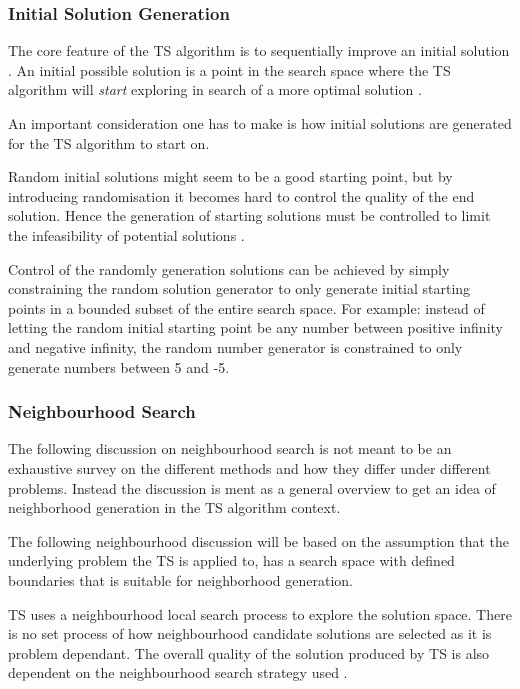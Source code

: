 \subsubsection{Initial Solution Generation}
The core feature of the \gls{TS} algorithm is to sequentially improve an initial solution \cite{TSHazardous}. An initial possible solution is a point in the search space where the \gls{TS} algorithm will \emph{start} exploring in search of a more optimal solution \cite{AIModernApproach,TSHazardous}.

An important consideration one has to make is how initial solutions are generated for the \gls{TS} algorithm to start on\cite{AIModernApproach,TSHazardous}.

Random initial solutions might seem to be a good starting point, but by introducing randomisation it becomes hard to control the quality of the end solution\cite{TSHazardous}. Hence the generation of starting solutions must be controlled to limit the infeasibility of potential solutions \cite{TSHazardous}. 

Control of the randomly generation solutions can be achieved by simply constraining the random solution generator to only generate initial starting points in a bounded subset of the entire search space. For example: instead of letting the random initial starting point be any number between positive infinity and negative infinity, the random number generator is constrained to only generate numbers between 5 and -5.

\subsubsection{Neighbourhood Search}
The following discussion on neighbourhood search is not meant to be an exhaustive survey on the different methods and how they differ under different problems. Instead the discussion is ment as a general overview to get an idea of neighborhood generation in the \gls{TS} algorithm context. 

The following neighbourhood discussion will be based on the assumption that the underlying problem the \gls{TS} is applied to, has a search space with defined boundaries that is suitable for neighborhood generation.

TS uses a neighbourhood local search process to explore the solution space. There is no set process of how neighbourhood candidate solutions are selected as it is problem dependant. The overall quality of the solution produced by \gls{TS} is also dependent on the neighbourhood search strategy used \cite{TSHazardous}. 

